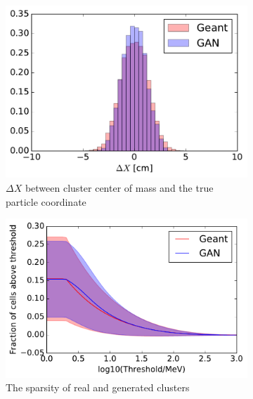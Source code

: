 \begin{figure}
\begin{subfigure}[t]{0.35\textwidth}
    \includegraphics[width=1\textwidth]{figures/deltaX.pdf}
    \caption{$\Delta X$ between cluster center of mass and the true particle coordinate}
  \end{subfigure}\hspace{0.2\textwidth}
  \begin{subfigure}[t]{0.35\textwidth}
    \centering
    \includegraphics[width=1\textwidth]{figures/sparsity.pdf}
    \caption{The sparsity of real and generated clusters}
  \end{subfigure}
  \begin{subfigure}[t]{0.35\textwidth}
    \centering

\end{subfigure}
\end{figure}
